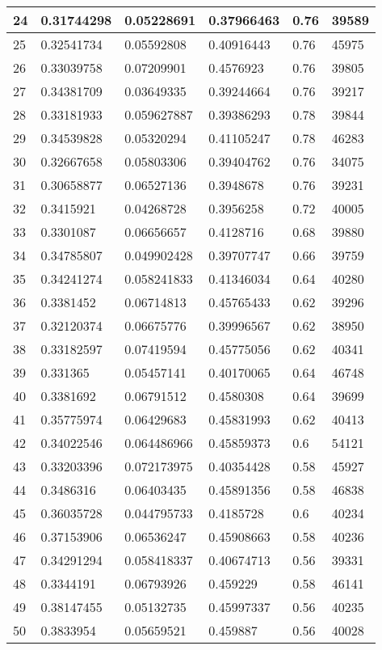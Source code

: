 \begin{longtable}{|l|l|l|l|l|l|}
24 & 0.31744298 & 0.05228691 & 0.37966463 & 0.76 & 39589 \\ \hline 
25 & 0.32541734 & 0.05592808 & 0.40916443 & 0.76 & 45975 \\ \hline 
26 & 0.33039758 & 0.07209901 & 0.4576923 & 0.76 & 39805 \\ \hline 
27 & 0.34381709 & 0.03649335 & 0.39244664 & 0.76 & 39217 \\ \hline 
28 & 0.33181933 & 0.059627887 & 0.39386293 & 0.78 & 39844 \\ \hline 
29 & 0.34539828 & 0.05320294 & 0.41105247 & 0.78 & 46283 \\ \hline 
30 & 0.32667658 & 0.05803306 & 0.39404762 & 0.76 & 34075 \\ \hline 
31 & 0.30658877 & 0.06527136 & 0.3948678 & 0.76 & 39231 \\ \hline 
32 & 0.3415921 & 0.04268728 & 0.3956258 & 0.72 & 40005 \\ \hline 
33 & 0.3301087 & 0.06656657 & 0.4128716 & 0.68 & 39880 \\ \hline 
34 & 0.34785807 & 0.049902428 & 0.39707747 & 0.66 & 39759 \\ \hline 
35 & 0.34241274 & 0.058241833 & 0.41346034 & 0.64 & 40280 \\ \hline 
36 & 0.3381452 & 0.06714813 & 0.45765433 & 0.62 & 39296 \\ \hline 
37 & 0.32120374 & 0.06675776 & 0.39996567 & 0.62 & 38950 \\ \hline 
38 & 0.33182597 & 0.07419594 & 0.45775056 & 0.62 & 40341 \\ \hline 
39 & 0.331365 & 0.05457141 & 0.40170065 & 0.64 & 46748 \\ \hline 
40 & 0.3381692 & 0.06791512 & 0.4580308 & 0.64 & 39699 \\ \hline 
41 & 0.35775974 & 0.06429683 & 0.45831993 & 0.62 & 40413 \\ \hline 
42 & 0.34022546 & 0.064486966 & 0.45859373 & 0.6 & 54121 \\ \hline 
43 & 0.33203396 & 0.072173975 & 0.40354428 & 0.58 & 45927 \\ \hline 
44 & 0.3486316 & 0.06403435 & 0.45891356 & 0.58 & 46838 \\ \hline 
45 & 0.36035728 & 0.044795733 & 0.4185728 & 0.6 & 40234 \\ \hline 
46 & 0.37153906 & 0.06536247 & 0.45908663 & 0.58 & 40236 \\ \hline 
47 & 0.34291294 & 0.058418337 & 0.40674713 & 0.56 & 39331 \\ \hline 
48 & 0.3344191 & 0.06793926 & 0.459229 & 0.58 & 46141 \\ \hline 
49 & 0.38147455 & 0.05132735 & 0.45997337 & 0.56 & 40235 \\ \hline 
50 & 0.3833954 & 0.05659521 & 0.459887 & 0.56 & 40028 \\ \hline 
\end{longtable}